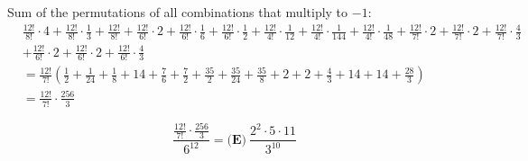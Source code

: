 \begin{enumerate}
Sum of the permutations of all combinations that multiply to $-1$:
 \begin{align*} &\frac{12!}{8!} \cdot 4 + \frac{12!}{8!} \cdot \frac13 + \frac{12!}{8!} + \frac{12!}{6!} \cdot 2 + \frac{12!}{6!} \cdot \frac16 + \frac{12!}{6!} \cdot \frac12 + \frac{12!}{4!} \cdot \frac{1}{12} + \frac{12!}{4!} \cdot \frac{1}{144} + \frac{12!}{4!} \cdot \frac{1}{48} + \frac{12!}{7!} \cdot 2 + \frac{12!}{7!} \cdot 2 + \frac{12!}{7!} \cdot \frac{4}{3}\\ &+ \frac{12!}{6!} \cdot 2 + \frac{12!}{6!} \cdot 2 + \frac{12!}{6!} \cdot \frac{4}{3} \\  &= \frac{12!}{7!} \left( \frac{1}{2} + \frac{1}{24} + \frac{1}{8} + 14 + \frac{7}{6} + \frac{7}{2} + \frac{35}{2} + \frac{35}{24} + \frac{35}{8} + 2 + 2 + \frac{4}{3} + 14 + 14 + \frac{28}{3} \right)\\ &= \frac{12!}{7!} \cdot \frac{256}{3} \end{align*}


 \[\frac{ \frac{12!}{7!} \cdot \frac{256}{3} }{ 6^{12} } = \boxed{\textbf{(E)} ~\frac{2^2\cdot 5\cdot 11}{3^{10}}}\]



\end{enumerate}